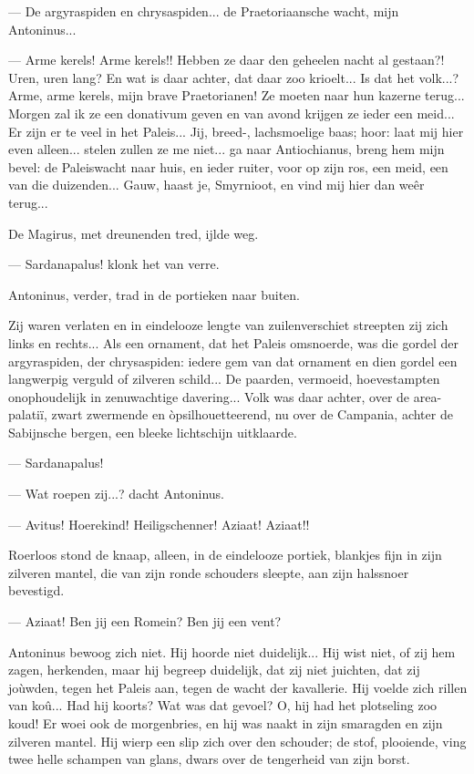 \documentclass[a4paper, 12pt, oneside, dutch]{article}
\begin{document}
--- De argyraspiden en chrysaspiden... de Praetoriaansche wacht, mijn Antoninus...

--- Arme kerels! Arme kerels!! Hebben ze daar den geheelen nacht al gestaan?! Uren, uren lang? En wat is daar achter, dat daar zoo krioelt... Is dat het volk...? Arme, arme kerels, mijn brave Praetorianen! Ze moeten naar hun kazerne terug... Morgen zal ik ze een donativum geven en van avond krijgen ze ieder een meid... Er zijn er te veel in het Paleis... Jij, breed-, lachsmoelige baas; hoor: laat mij hier even alleen... stelen zullen ze me niet... ga naar Antiochianus, breng hem mijn bevel: de Paleiswacht naar huis, en ieder ruiter, voor op zijn ros, een meid, een van die duizenden... Gauw, haast je, Smyrnioot, en vind mij hier dan weêr terug...

De Magirus, met dreunenden tred, ijlde weg.

--- Sardanapalus! klonk het van verre.

Antoninus, verder, trad in de portieken naar buiten.

Zij waren verlaten en in eindelooze lengte van zuilenverschiet streepten zij zich links en rechts... Als een ornament, dat het Paleis omsnoerde, was die gordel der argyraspiden, der chrysaspiden: iedere gem van dat ornament en dien gordel een langwerpig verguld of zilveren schild... De paarden, vermoeid, hoevestampten onophoudelijk in zenuwachtige davering... Volk was daar achter, over de area-palatiï, zwart zwermende en òpsilhouetteerend, nu over de Campania, achter de Sabijnsche bergen, een bleeke lichtschijn uitklaarde.

--- Sardanapalus!

--- Wat roepen zij...? dacht Antoninus.

--- Avitus! Hoerekind! Heiligschenner! Aziaat! Aziaat!!

Roerloos stond de knaap, alleen, in de eindelooze portiek, blankjes fijn in zijn zilveren mantel, die van zijn ronde schouders sleepte, aan zijn halssnoer bevestigd.

--- Aziaat! Ben jij een Romein? Ben jij een vent?

Antoninus bewoog zich niet. Hij hoorde niet duidelijk... Hij wist niet, of zij hem zagen, herkenden, maar hij begreep duidelijk, dat zij niet juichten, dat zij joùwden, tegen het Paleis aan, tegen de wacht der kavallerie. Hij voelde zich rillen van koû... Had hij koorts? Wat was dat gevoel? O, hij had het plotseling zoo koud! Er woei ook de morgenbries, en hij was naakt in zijn smaragden en zijn zilveren mantel. Hij wierp een slip zich over den schouder; de stof, plooiende, ving twee helle schampen van glans, dwars over de tengerheid van zijn borst.
\end{document}
